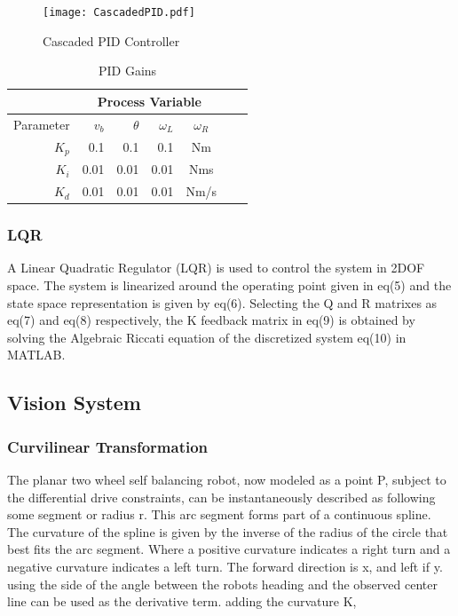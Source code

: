         \begin{figure}[H]
            \texttt{[image: CascadedPID.pdf]}
            \caption{Cascaded PID Controller}
        \end{figure}

        \begin{table}[H]
            \centering
            \begin{tabular}{|r|r|r|r|c|c|c}
                \hline
                & \multicolumn{4}{c|}{Process Variable}  \\
                \hline
                Parameter & $v_b$ & $\theta$  & $\omega_L$ & $\omega_R$ \\
                \hline      
                $K_p$ & 0.1 & 0.1 & 0.1 & Nm \\
                $K_i$ & 0.01 & 0.01 & 0.01 & Nms \\
                $K_d$ & 0.01 & 0.01 & 0.01 & Nm/s \\
                \hline
            \end{tabular}
            \caption{PID Gains}
        \end{table}
        \pagebreak{}
        \subsubsection{LQR}
        A Linear Quadratic Regulator (LQR) is used to control the system in 2DOF space.
        The system is linearized around the operating point given in eq(5) 
        and the state space representation is given by eq(6).
        Selecting the Q and R matrixes as eq(7) and eq(8) respectively, 
        the K feedback matrix in eq(9) is obtained by solving the Algebraic Riccati
        equation of the discretized system eq(10) in MATLAB.

         

    \subsection{Vision System}
        \subsubsection{Curvilinear Transformation}
        The planar two wheel self balancing robot, now modeled as a point P, subject to the differential drive constraints, 
        can be instantaneously described as following some segment or radius r. This arc segment forms part of a continuous spline. 
        The curvature of the spline is given by the inverse of the radius of the circle that best fits the arc segment.
        Where a positive curvature indicates a right turn and a negative curvature indicates a left turn.
        The forward direction is x, and left if y. using the side of the angle between the robots heading and the observed center line can be used as the derivative term.
        adding the curvature K, 
